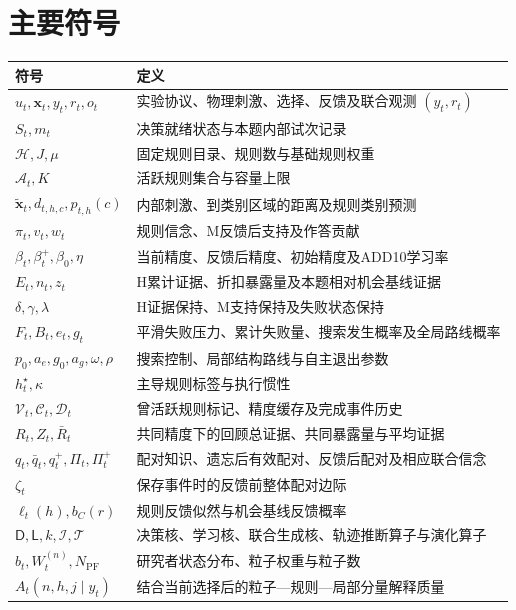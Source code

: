 \documentclass[11pt,a4paper]{article}
\numberwithin{equation}{section}
\newcommand{\A}{\mathcal{A}}
\newcommand{\Hh}{\mathcal{H}}
\newcommand{\Dd}{\mathsf{D}}
\newcommand{\Ll}{\mathsf{L}}
\newcommand{\Ii}{\mathcal{I}}
\newcommand{\Tt}{\mathcal{T}}
\begin{document}
\clearpage
\section{主要符号}
\label{app:symbols}
{\small
\begin{longtable}{L{4.0cm}L{10.9cm}}
\toprule
符号 & 定义\\
\midrule\endhead
$u_t,\bm x_t,y_t,r_t,o_t$ & 实验协议、物理刺激、选择、反馈及联合观测 $(y_t,r_t)$\\
$S_t,m_t$ & 决策就绪状态与本题内部试次记录\\
$\Hh,J,\mu$ & 固定规则目录、规则数与基础规则权重\\
$\A_t,K$ & 活跃规则集合与容量上限\\
$\widetilde{\bm x}_t,d_{t,h,c},p_{t,h}(c)$ & 内部刺激、到类别区域的距离及规则类别预测\\
$\pi_t,v_t,w_t$ & 规则信念、M反馈后支持及作答贡献\\
$\beta_t,\beta_t^+,\beta_0,\eta$ & 当前精度、反馈后精度、初始精度及ADD10学习率\\
$E_t,n_t,z_t$ & H累计证据、折扣暴露量及本题相对机会基线证据\\
$\delta,\gamma,\lambda$ & H证据保持、M支持保持及失败状态保持\\
$F_t,B_t,e_t,g_t$ & 平滑失败压力、累计失败量、搜索发生概率及全局路线概率\\
$p_0,a_e,g_0,a_g,\omega,\rho$ & 搜索控制、局部结构路线与自主退出参数\\
$h_t^\star,\kappa$ & 主导规则标签与执行惯性\\
$\mathcal V_t,\mathcal C_t,\mathcal D_t$ & 曾活跃规则标记、精度缓存及完成事件历史\\
$R_t,Z_t,\bar R_t$ & 共同精度下的回顾总证据、共同暴露量与平均证据\\
$q_t,\bar q_t,q_t^+,\Pi_t,\Pi_t^+$ & 配对知识、遗忘后有效配对、反馈后配对及相应联合信念\\
$\zeta_t$ & 保存事件时的反馈前整体配对边际\\
$\ell_t(h),b_C(r)$ & 规则反馈似然与机会基线反馈概率\\
$\Dd,\Ll,k,\Ii,\Tt$ & 决策核、学习核、联合生成核、轨迹推断算子与演化算子\\
$b_t,W_t^{(n)},N_{\mathrm{PF}}$ & 研究者状态分布、粒子权重与粒子数\\
$A_t(n,h,j\mid y_t)$ & 结合当前选择后的粒子—规则—局部分量解释质量\\
\bottomrule
\end{longtable}}
\end{document}
